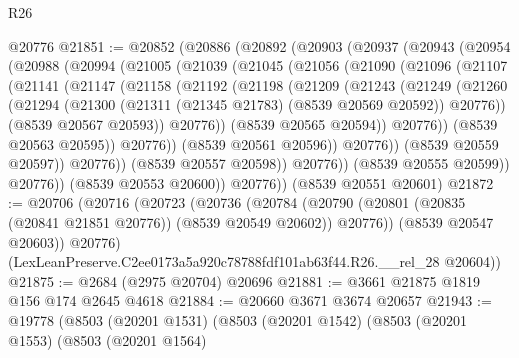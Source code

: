 \begin{lexlean}{R26}
\begin{coremodule}
    @20776
@21851 := @20852
    (@20886
      (@20892
        (@20903
          (@20937
            (@20943
              (@20954
                (@20988
                  (@20994
                    (@21005
                      (@21039
                        (@21045
                          (@21056
                            (@21090
                              (@21096
                                (@21107
                                  (@21141
                                    (@21147
                                      (@21158
                                        (@21192
                                          (@21198
                                            (@21209
                                              (@21243
                                                (@21249
                                                  (@21260
                                                    (@21294
                                                      (@21300
                                                        (@21311
                                                          (@21345 @21783)
                                                          (@8539 @20569 @20592))
                                                        @20776))
                                                    (@8539 @20567 @20593))
                                                  @20776))
                                              (@8539 @20565 @20594))
                                            @20776))
                                        (@8539 @20563 @20595))
                                      @20776))
                                  (@8539 @20561 @20596))
                                @20776))
                            (@8539 @20559 @20597))
                          @20776))
                      (@8539 @20557 @20598))
                    @20776))
                (@8539 @20555 @20599))
              @20776))
          (@8539 @20553 @20600))
        @20776))
    (@8539 @20551 @20601)
@21872 := @20706
    (@20716
      (@20723
        (@20736
          (@20784 (@20790 (@20801 (@20835 (@20841 @21851 @20776)) (@8539 @20549 @20602)) @20776))
          (@8539 @20547 @20603))
        @20776)
      (LexLeanPreserve.C2ee0173a5a920c78788fdf101ab63f44.R26.__rel_28 @20604))
@21875 := @2684 (@2975 @20704) @20696
@21881 := @3661 @21875 @1819 @156 @174 @2645 @4618
@21884 := @20660 @3671 @3674 @20657
@21943 := @19778
    (@8503
      (@20201 @1531)
      (@8503
        (@20201 @1542)
        (@8503
          (@20201 @1553)
          (@8503
            (@20201 @1564)

\end{coremodule}
\end{lexlean}
